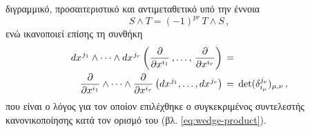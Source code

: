 \documentclass[11pt,a4paper,twoside,openright]{book}
\begin{document}
διγραμμικό, προσαιτεριστικό και αντιμεταθετικό υπό την έννοια
\begin{equation}\label{eq:wedge-anticommutativity}
S \wedge T = (-1)^{pr} \, T \wedge S\,,
\end{equation}
ενώ ικανοποιεί επίσης τη συνθήκη
\setlength{\jot}{10pt}
\begin{equation}\label{eq:wedge-product-kronecker}
\begin{split}
dx^{\hspace{.75pt}j_1} \wedge \dots \wedge dx^{\hspace{.75pt}j_r}
\left(
\frac{\partial}{\partial x^{i_1}}\,,
\dots,\,
\frac{\partial}{\partial x^{i_r}}
\right)
\,&=\,\\
\frac{\partial}{\partial x^{i_1}} \wedge \dots \wedge \frac{\partial}{\partial x^{i_r}}
\left(
dx^{\hspace{.5pt}j_1},
\dots,
dx^{\hspace{.5pt}j_r}
\right)
\,&=\,
\det (\delta_{i_\mu}^{j_{\nu}})_{\mu, \nu}\,,
\end{split}
\end{equation}
που είναι ο λόγος για τον οποίον επιλέχθηκε
ο συγκεκριμένος συντελεστής κανονικοποίησης κατά τον ορισμό του (βλ. \eqref{eq:wedge-product}).
\end{document}
